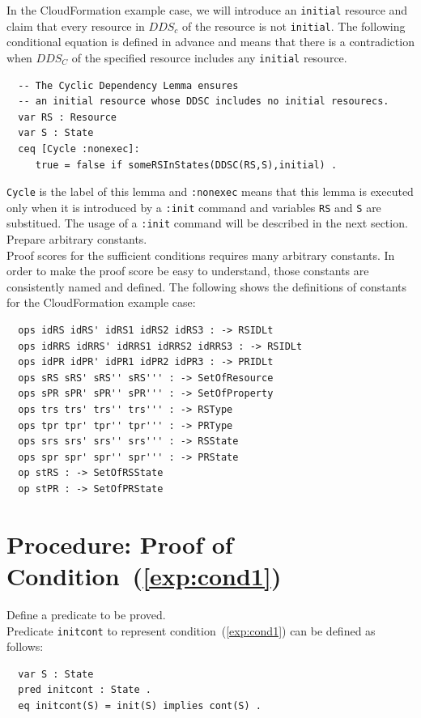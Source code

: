 \documentclass[12pt]{report}
\begin{document}
In the CloudFormation example case, we will introduce an {\tt initial}
resource and claim that every resource in $DDS_c$ of the resource is
not {\tt initial}. The following conditional equation is defined in
advance and means that there is a contradiction when $DDS_C$ of the
specified resource includes any {\tt initial} resource.
\small
\begin{verbatim}
  -- The Cyclic Dependency Lemma ensures
  -- an initial resource whose DDSC includes no initial resourecs.
  var RS : Resource
  var S : State
  ceq [Cycle :nonexec]: 
     true = false if someRSInStates(DDSC(RS,S),initial) .
\end{verbatim}
\normalsize
{\tt Cycle} is the label of this lemma and {\tt :nonexec} means that
this lemma is executed only when it is introduced by a {\tt :init}
command and variables {\tt RS} and {\tt S} are substitued. The usage
of a {\tt :init} command will be described in the next section.\\

 Prepare arbitrary constants. \\
Proof scores for the sufficient conditions requires many arbitrary constants.
In order to make the proof score be easy to understand, those constants
are consistently named and defined. The following shows the definitions
of constants for the CloudFormation example case:
\small
\begin{verbatim}
  ops idRS idRS' idRS1 idRS2 idRS3 : -> RSIDLt
  ops idRRS idRRS' idRRS1 idRRS2 idRRS3 : -> RSIDLt
  ops idPR idPR' idPR1 idPR2 idPR3 : -> PRIDLt
  ops sRS sRS' sRS'' sRS''' : -> SetOfResource
  ops sPR sPR' sPR'' sPR''' : -> SetOfProperty
  ops trs trs' trs'' trs''' : -> RSType
  ops tpr tpr' tpr'' tpr''' : -> PRType
  ops srs srs' srs'' srs''' : -> RSState
  ops spr spr' spr'' spr''' : -> PRState
  op stRS : -> SetOfRSState
  op stPR : -> SetOfPRState
\end{verbatim}
\normalsize
\section{Procedure: Proof of Condition~(\ref{exp:cond1})}
\label{sec:initcont}
 Define a predicate to be proved. \\
Predicate {\tt initcont} to represent condition~(\ref{exp:cond1}) can be defined as follows:
\small
\begin{verbatim}
  var S : State
  pred initcont : State .
  eq initcont(S) = init(S) implies cont(S) .
\end{verbatim}
\normalsize
\end{document}
